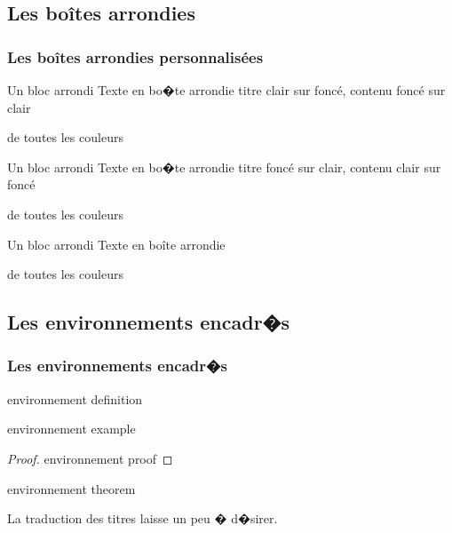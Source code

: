 \documentclass[slidetop,11pt]{beamer}
\begin{document}
\subsection{Les boîtes arrondies}
\begin{frame}
\frametitle{Les boîtes arrondies personnalisées}
\begin{beamerboxesrounded}[lower=bas, upper=haut, shadow=true]{Un bloc arrondi}
Texte en bo�te arrondie titre clair sur foncé, contenu foncé sur clair

de toutes les couleurs
\end{beamerboxesrounded}
\vfill
\begin{beamerboxesrounded}[lower=haut, upper=bas, shadow=true]{Un bloc arrondi}
Texte en bo�te arrondie titre foncé sur clair, contenu clair sur foncé

de toutes les couleurs
\end{beamerboxesrounded}
\vfill
\begin{beamerboxesrounded}[scheme=compar, shadow=true]{Un bloc arrondi}
Texte en boîte arrondie

de toutes les couleurs
\end{beamerboxesrounded}
\end{frame}
\subsection[Encadrés]{Les environnements encadr�s}
\begin{frame}
\frametitle{Les environnements encadr�s}
  \begin{definition}
    environnement definition
  \end{definition}
  
 \begin{example}
   environnement example
 \end{example}

 \begin{proof}
   environnement proof
 \end{proof}  
    
\begin{theorem}
environnement theorem
\end{theorem}

La traduction des titres laisse un peu � d�sirer.
\end{frame}
\end{document}
